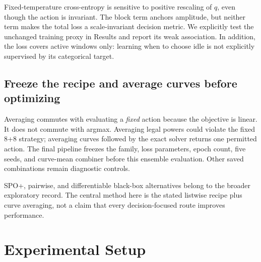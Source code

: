 \documentclass[11pt,a4paper]{article}
\begin{document}
Fixed-temperature cross-entropy is sensitive to positive rescaling of $q$, even though the action is invariant. The block term anchors amplitude, but neither term makes the total loss a scale-invariant decision metric. We explicitly test the unchanged training proxy in Results and report its weak association. In addition, the loss covers active windows only: learning when to choose idle is not explicitly supervised by its categorical target.

\subsection{Freeze the recipe and average curves before optimizing}
\EqMean
Averaging commutes with evaluating a \emph{fixed} action because the objective is linear. It does not commute with argmax. Averaging legal powers could violate the fixed 8+8 strategy; averaging curves followed by the exact solver returns one permitted action. The final pipeline freezes the family, loss parameters, epoch count, five seeds, and curve-mean combiner before this ensemble evaluation. Other saved combinations remain diagnostic controls.

SPO+, pairwise, and differentiable black-box alternatives belong to the broader exploratory record. The central method here is the stated listwise recipe plus curve averaging, not a claim that every decision-focused route improves performance.
\FloatBarrier

\section{Experimental Setup}
\end{document}
